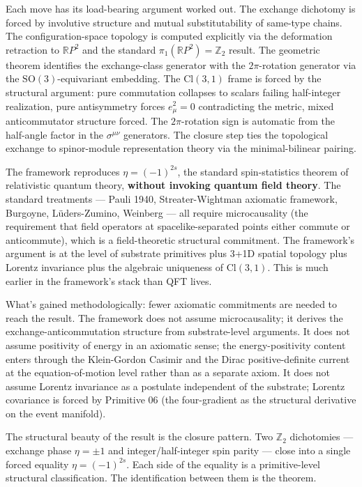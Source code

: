 \documentclass[11pt,a4paper]{article}
\begin{document}
Each move has its load-bearing argument worked out. The exchange dichotomy is forced by involutive structure and mutual substitutability of same-type chains. The configuration-space topology is computed explicitly via the deformation retraction to $\mathbb{R}P^{2}$ and the standard $\pi_1(\mathbb{R}P^{2}) = \mathbb{Z}_2$ result. The geometric theorem identifies the exchange-class generator with the $2\pi$-rotation generator via the $\mathrm{SO}(3)$-equivariant embedding. The $\mathrm{Cl}(3,1)$ frame is forced by the structural argument: pure commutation collapses to scalars failing half-integer realization, pure antisymmetry forces $e_\mu^{2} = 0$ contradicting the metric, mixed anticommutator structure forced. The $2\pi$-rotation sign is automatic from the half-angle factor in the $\sigma^{\mu\nu}$ generators. The closure step ties the topological exchange to spinor-module representation theory via the minimal-bilinear pairing.

The framework reproduces $\eta = (-1)^{2s}$, the standard spin-statistics theorem of relativistic quantum theory, \textbf{without invoking quantum field theory}. The standard treatments --- Pauli 1940, Streater-Wightman axiomatic framework, Burgoyne, L\"uders-Zumino, Weinberg --- all require microcausality (the requirement that field operators at spacelike-separated points either commute or anticommute), which is a field-theoretic structural commitment. The framework's argument is at the level of substrate primitives plus 3+1D spatial topology plus Lorentz invariance plus the algebraic uniqueness of $\mathrm{Cl}(3,1)$. This is much earlier in the framework's stack than QFT lives.

What's gained methodologically: fewer axiomatic commitments are needed to reach the result. The framework does not assume microcausality; it derives the exchange-anticommutation structure from substrate-level arguments. It does not assume positivity of energy in an axiomatic sense; the energy-positivity content enters through the Klein-Gordon Casimir and the Dirac positive-definite current at the equation-of-motion level rather than as a separate axiom. It does not assume Lorentz invariance as a postulate independent of the substrate; Lorentz covariance is forced by Primitive 06 (the four-gradient as the structural derivative on the event manifold).

The structural beauty of the result is the closure pattern. Two $\mathbb{Z}_2$ dichotomies --- exchange phase $\eta = \pm 1$ and integer/half-integer spin parity --- close into a single forced equality $\eta = (-1)^{2s}$. Each side of the equality is a primitive-level structural classification. The identification between them is the theorem.
\end{document}
